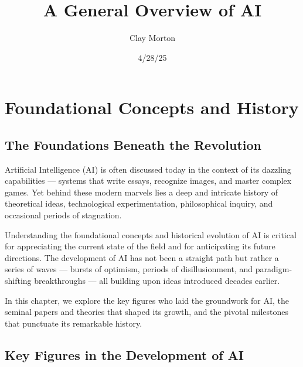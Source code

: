 \documentclass[openany]{book}
\title{A General Overview of AI}
\author{Clay Morton}
\date{4/28/25}
\begin{document}
\maketitle

\begingroup
\let\cleardoublepage\relax
\tableofcontents
\endgroup

\chapter{Foundational Concepts and History}

\section{The Foundations Beneath the Revolution}

Artificial Intelligence (AI) is often discussed today in the context of its 
dazzling capabilities — systems that write essays, recognize images, and master 
complex games. Yet behind these modern marvels lies a deep and intricate history 
of theoretical ideas, technological experimentation, philosophical inquiry, and 
occasional periods of stagnation.

Understanding the foundational concepts and historical evolution of AI is 
critical for appreciating the current state of the field and for anticipating 
its future directions. The development of AI has not been a straight path but 
rather a series of waves — bursts of optimism, periods of disillusionment, and 
paradigm-shifting breakthroughs — all building upon ideas introduced decades 
earlier.

In this chapter, we explore the key figures who laid the groundwork for AI, the
seminal papers and theories that shaped its growth, and the pivotal milestones 
that punctuate its remarkable history.

\section{Key Figures in the Development of AI}
\end{document}
